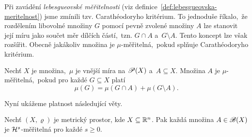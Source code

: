 Při zavádění \emph{lebesgueovské měřitelnosti} (viz definice~\ref{def:lebesgueovska-meritelnost}) jsme zmínili tzv. Carathéodoryho kritérium. To jednoduše říkalo,~že rozdělením libovolné množiny $G$ pomocí pevně zvolené množiny $A$ lze stanovit její míru jako součet měr dílčích částí,~tzn. $G\cap A$ a~$G\setminus A$. Tento koncept lze však rozšířit. Obecně jakákoliv množina je $\mu$-měřitelná,~pokud splňuje Carathéodoryho kritérium.
\begin{definition}\label{def:meritelnost}
    Nechť $X$ je množina,~$\mu$ je vnější míra na $\mathscr{P}(X)$ a~$A\subseteq X$. Množina $A$ je $\mu$-měřitelná,~pokud pro každé $G\subseteq X$ platí
    \[\mu(G)=\mu(G\cap A)+\mu(G\setminus A).\]
\end{definition}
Nyní ukážeme platnost následující věty.
\begin{theorem}\label{thm:hs-meritelnost-borel-mnozin}
    Nechť $(X,\varrho)$ je metrický prostor, kde $X\subseteq\mathbb{R}^n$. Pak každá množina $A\in\mathscr{B}(X)$ je $\mathcal{H}^{s}$-měřitelná pro každé $s\geqslant 0$.
\end{theorem}
